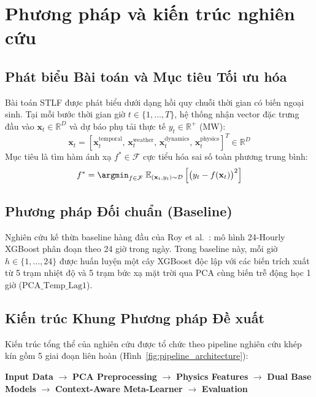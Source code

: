 \section{Phương pháp và kiến trúc nghiên cứu}
\label{sec:methodology_architecture}

\subsection{Phát biểu Bài toán và Mục tiêu Tối ưu hóa}
Bài toán STLF được phát biểu dưới dạng hồi quy chuỗi thời gian có biến ngoại sinh. Tại mỗi bước thời gian giờ $t \in \{1, \dots, T\}$, hệ thống nhận vector đặc trưng đầu vào $\mathbf{x}_t \in \mathbb{R}^D$ và dự báo phụ tải thực tế $y_t \in \mathbb{R}^+$ (MW):
\begin{equation}
    \mathbf{x}_t = \left[ \mathbf{x}_t^{\text{temporal}}, \, \mathbf{x}_t^{\text{weather}}, \, \mathbf{x}_t^{\text{dynamics}}, \, \mathbf{x}_t^{\text{physics}} \right]^T \in \mathbb{R}^D
\end{equation}
Mục tiêu là tìm hàm ánh xạ $f^* \in \mathcal{F}$ cực tiểu hóa sai số toàn phương trung bình:
\begin{equation}
    f^* = \argmin_{f \in \mathcal{F}} \; \mathbb{E}_{(\mathbf{x}_t, y_t) \sim \mathcal{D}} \left[ \big(y_t - f(\mathbf{x}_t)\big)^2 \right]
\end{equation}

\subsection{Phương pháp Đối chuẩn (Baseline)}
Nghiên cứu kế thừa baseline hàng đầu của Roy et al.~\cite{roy2025hourly}: mô hình 24-Hourly XGBoost phân đoạn theo 24 giờ trong ngày. Trong baseline này, mỗi giờ $h \in \{1, \dots, 24\}$ được huấn luyện một cây XGBoost độc lập với các biến trích xuất từ 5 trạm nhiệt độ và 5 trạm bức xạ mặt trời qua PCA cùng biến trễ động học 1 giờ ($\text{PCA\_Temp\_Lag1}$).

\subsection{Kiến trúc Khung Phương pháp Đề xuất}
Kiến trúc tổng thể của nghiên cứu được tổ chức theo pipeline nghiên cứu khép kín gồm 5 giai đoạn liên hoàn (Hình~\ref{fig:pipeline_architecture}):
\begin{center}
\textbf{Input Data} $\to$ \textbf{PCA Preprocessing} $\to$ \textbf{Physics Features} $\to$ \textbf{Dual Base Models} $\to$ \textbf{Context-Aware Meta-Learner} $\to$ \textbf{Evaluation}
\end{center}

